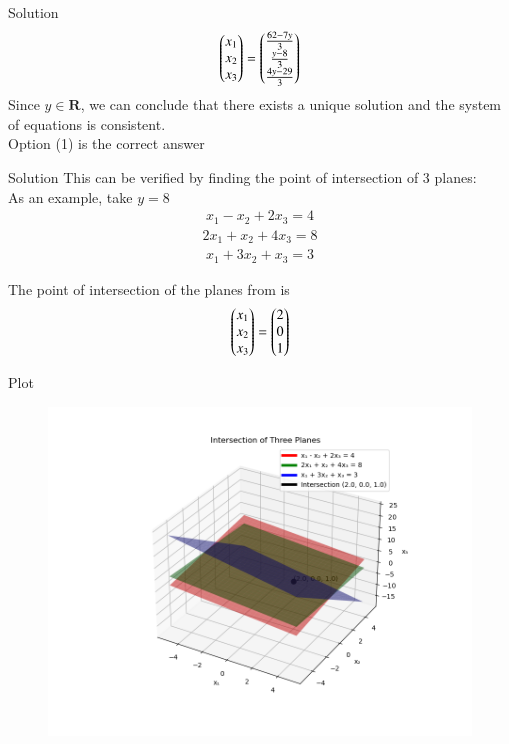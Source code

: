 \documentclass{beamer}
\begin{document}
\begin{frame}{Solution}
\begin{align}
\begin{pmatrix}x_1 \\ x_2 \\ x_3\end{pmatrix} = \begin{pmatrix}\frac{62 - 7y}{3} \\ \frac{y-8}{3} \\ \frac{4y - 29}{3}\end{pmatrix}
\end{align}
Since $y  \in \mathbf{R}$, we can conclude that there exists a unique solution and the system of equations is consistent. \\

Option (1) is the correct answer

\end{frame}

\begin{frame}{Solution}
This can be verified by finding the point of intersection of 3 planes:\\
As an example, take $y = 8$
\begin{align}
x_1 - x_2 + 2x_3 = 4
\end{align}
\begin{align}
2x_1 + x_2 + 4x_3 = 8
\end{align}
\begin{align}
x_1 + 3x_2 + x_3 = 3
\end{align}

The point of intersection of the planes from  is
\begin{align}
\begin{pmatrix}x_1 \\ x_2 \\ x_3\end{pmatrix} = \begin{pmatrix}2 \\ 0 \\ 1\end{pmatrix}
\end{align}
\end{frame}

\begin{frame}{Plot}
\begin{figure}[H]
    \centering
    \includegraphics[height=0.5\textheight, keepaspectratio]{figs/Figure_1.png}
    \label{figure_1}
\end{figure}
\end{frame}
\end{document}
